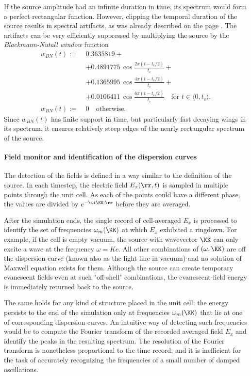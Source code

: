 If the source amplitude had an infinite duration in time, its spectrum would form a perfect rectangular function. However, clipping the temporal duration of the source results in spectral artifacts, as was already described on the page \pageref{convolringing}.
The artifacts can be very efficiently suppressed by multiplying the source by the \textit{Blackmann-Nutall window}  function
\begin{equation} 
\begin{split} 
	w_{BN}(t) :=\; & 0.3635819 + \\
			 &+ 0.4891775\,\cos\frac{2\pi(t-t_c/2)}{t_c} + \\
			&+ 0.1365995\,\cos\frac{4\pi(t-t_c/2)}{t_c} + \\
			&+ 0.0106411\,\cos\frac{6\pi(t-t_c/2)}{t_c} \quad \text{for } t\in\langle0, t_c\rangle, \\
	w_{BN}(t) :=\;& 0 \quad \text{otherwise.}
\end{split} 
\label{eq_wBN}\end{equation} %
Since $w_{BN}(t)$ has finite support in time, but particularly fast decaying wings in its spectrum, it ensures relatively steep edges of the nearly rectangular spectrum of the source.

\paragraph{Field monitor and identification of the dispersion curves}%
The detection of the fields is defined in a way similar to the definition of the source. In each timestep, the electric field $E_x(\rr,t)$ is sampled in multiple points through the unit cell. As each of the points could have a different phase, the values are divided by $e^{-\ii \KK\cdot \rr}$ before they are averaged.

After the simulation ends, the single record of cell-averaged $E_x$ is processed to identify the set of frequencies $\omega_m(\KK)$ at which $E_x$ exhibited a ringdown. For example, if the cell is empty vacuum, the source with wavevector $\KK$ can only excite a wave at the frequency $\omega = Kc$. All other combinations of $(\omega, \KK)$ are off the dispersion curve (known also as the light line in vacuum) and no solution of Maxwell equation exists for them. Although the source can create temporary evanescent fields even at such "off-shell" combinations, the evanescent-field energy is immediately returned back to the source. 

The same holds for any kind of structure placed in the unit cell: the energy persists to the end of the simulation only at frequencies $\omega_m(\KK)$ that lie at one of corresponding dispersion curves. An intuitive way of detecting such frequencies would be to compute the Fourier transform of the recorded averaged field $E_x$ and identify the peaks in the resulting spectrum. The resolution of the Fourier transform is nonetheless proportional to the time record, and it is inefficient for the task of accurately recognizing the frequencies of a small number of damped oscillations.

